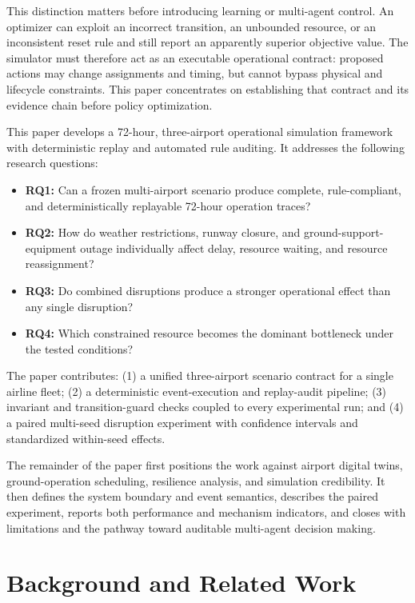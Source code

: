 \documentclass[runningheads]{llncs}
\begin{document}
This distinction matters before introducing learning or multi-agent control. An optimizer can exploit an incorrect transition, an unbounded resource, or an inconsistent reset rule and still report an apparently superior objective value. The simulator must therefore act as an executable operational contract: proposed actions may change assignments and timing, but cannot bypass physical and lifecycle constraints. This paper concentrates on establishing that contract and its evidence chain before policy optimization.

This paper develops a 72-hour, three-airport operational simulation framework with deterministic replay and automated rule auditing. It addresses the following research questions:
\begin{itemize}
  \item \textbf{RQ1:} Can a frozen multi-airport scenario produce complete, rule-compliant, and deterministically replayable 72-hour operation traces?
  \item \textbf{RQ2:} How do weather restrictions, runway closure, and ground-support-equipment outage individually affect delay, resource waiting, and resource reassignment?
  \item \textbf{RQ3:} Do combined disruptions produce a stronger operational effect than any single disruption?
  \item \textbf{RQ4:} Which constrained resource becomes the dominant bottleneck under the tested conditions?
\end{itemize}
The paper contributes: (1) a unified three-airport scenario contract for a single airline fleet; (2) a deterministic event-execution and replay-audit pipeline; (3) invariant and transition-guard checks coupled to every experimental run; and (4) a paired multi-seed disruption experiment with confidence intervals and standardized within-seed effects.

The remainder of the paper first positions the work against airport digital twins, ground-operation scheduling, resilience analysis, and simulation credibility. It then defines the system boundary and event semantics, describes the paired experiment, reports both performance and mechanism indicators, and closes with limitations and the pathway toward auditable multi-agent decision making.

\section{Background and Related Work}
\end{document}
